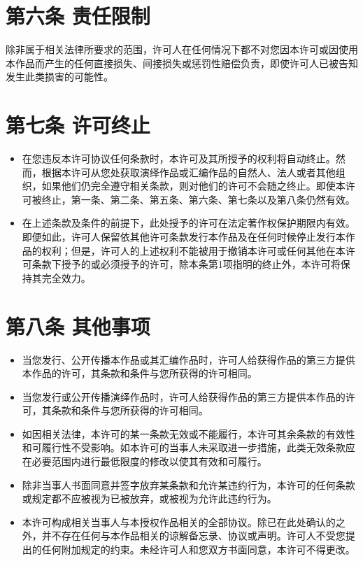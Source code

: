 \documentclass{book}
\begin{document}
\section{第六条 责任限制}
除非属于相关法律所要求的范围，许可人在任何情况下都不对您因本许可或因使用本作品而产生的任何直接损失、间接损失或惩罚性赔偿负责，即使许可人已被告知发生此类损害的可能性。 
\section{第七条 许可终止}
\begin{itemize}
	\item 在您违反本许可协议任何条款时，本许可及其所授予的权利将自动终止。然而，根据本许可从您处获取演绎作品或汇编作品的自然人、法人或者其他组织，如果他们仍完全遵守相关条款，则对他们的许可不会随之终止。即使本许可被终止，第一条、第二条、第五条、第六条、第七条以及第八条仍然有效。
	\item 在上述条款及条件的前提下，此处授予的许可在法定著作权保护期限内有效。即便如此，许可人保留依其他许可条款发行本作品及在任何时候停止发行本作品的权利；但是，许可人的上述权利不能被用于撤销本许可或任何其他在本许可条款下授予的或必须授予的许可，除本条第1项指明的终止外，本许可将保持其完全效力。
\end{itemize}
\section{第八条 其他事项}
\begin{itemize}
	\item 当您发行、公开传播本作品或其汇编作品时，许可人给获得作品的第三方提供本作品的许可，其条款和条件与您所获得的许可相同。
	\item 当您发行或公开传播演绎作品时，许可人给获得作品的第三方提供本作品的许可，其条款和条件与您所获得的许可相同。
	\item 如因相关法律，本许可的某一条款无效或不能履行，本许可其余条款的有效性和可履行性不受影响。如本许可的当事人未采取进一步措施，此类无效条款应在必要范围内进行最低限度的修改以使其有效和可履行。
	\item 除非当事人书面同意并签字放弃某条款和允许某违约行为，本许可的任何条款或规定都不应被视为已被放弃，或被视为允许此违约行为。
	\item 本许可构成相关当事人与本授权作品相关的全部协议。除已在此处确认的之外，并不存在任何与本作品相关的谅解备忘录、协议或声明。许可人不受您提出的任何附加规定的约束。未经许可人和您双方书面同意，本许可不得更改。
\end{itemize}
\end{document}
